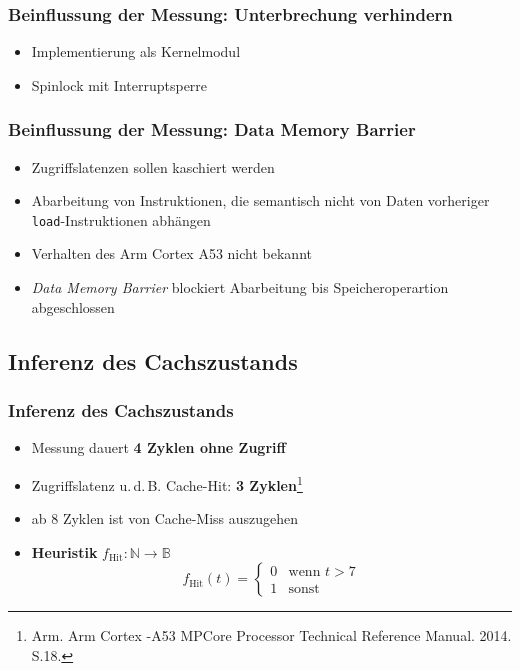 \documentclass{beamer}
\begin{document}
\begin{frame}
\frametitle{Beinflussung der Messung: Unterbrechung verhindern}
\begin{itemize}
	\item Implementierung als Kernelmodul
	\item Spinlock mit Interruptsperre
\end{itemize}
\end{frame}

\begin{frame}
\frametitle{Beinflussung der Messung: Data Memory Barrier}
\begin{itemize}
	\item Zugriffslatenzen sollen kaschiert werden
	\item Abarbeitung von Instruktionen, die semantisch nicht von Daten vorheriger \texttt{load}-Instruktionen abhängen
	\item Verhalten des Arm Cortex A53 nicht bekannt
	\item \textit{Data Memory Barrier} blockiert Abarbeitung bis Speicheroperartion abgeschlossen
\end{itemize}
\end{frame}

\subsection{Inferenz des Cachszustands}
\begin{frame}
\frametitle{Inferenz des Cachszustands}
\begin{itemize}
	\item Messung dauert \textbf{4 Zyklen ohne Zugriff}
	\item Zugriffslatenz u.\,d.\,B. Cache-Hit: \textbf{3 Zyklen}\footnote{\tiny Arm. Arm Cortex -A53 MPCore Processor Technical Reference Manual. 2014. S.18.}
	\item ab $8$ Zyklen ist von Cache-Miss auszugehen
	\item \textbf{Heuristik} $f_{\textrm{Hit}}: \mathbb{N} \rightarrow \mathbb{B}$
	\begin{equation}
	f_{\textrm{Hit}} (t) =
	\begin{cases}
        0 & \textrm{wenn } t > 7\\
        1 & \textrm{sonst}
	\end{cases} 
\end{equation}
\end{itemize}
\end{frame}
\end{document}
